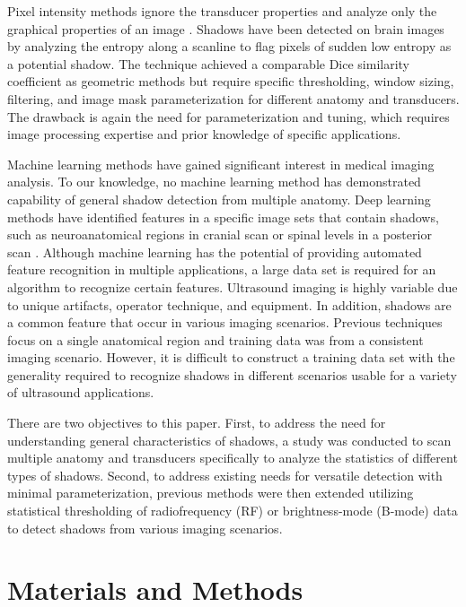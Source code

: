\documentclass[authoryear,preprint,review,12pt]{elsarticle}
\begin{document}
Pixel intensity methods ignore the transducer properties and analyze only the graphical properties of an image \citep{Hellier2010}. Shadows have been detected on brain images by analyzing the entropy along a scanline to flag pixels of sudden low entropy as a potential shadow. The technique achieved a comparable Dice similarity coefficient as geometric methods but require specific thresholding, window sizing, filtering, and image mask parameterization for different anatomy and transducers. The drawback is again the need for parameterization and tuning, which requires image processing expertise and prior knowledge of specific applications.

Machine learning methods have gained significant interest in medical imaging analysis. To our knowledge, no machine learning method has demonstrated capability of general shadow detection from multiple anatomy. Deep learning methods have identified features in a specific image sets that contain shadows, such as neuroanatomical regions in cranial scan \citep{Milletari2017} or spinal levels in a posterior scan \citep{Hetherington2017}. Although machine learning has the potential of providing automated feature recognition in multiple applications, a large data set is required for an algorithm to recognize certain features. Ultrasound imaging is highly variable due to unique artifacts, operator technique, and equipment. In addition, shadows are a common feature that occur in various imaging scenarios. Previous techniques focus on a single anatomical region and training data was from a consistent imaging scenario. However, it is difficult to construct a training data set with the generality required to recognize shadows in different scenarios usable for a variety of ultrasound applications.

There are two objectives to this paper. First, to address the need for understanding general characteristics of shadows, a study was conducted to scan multiple anatomy and transducers specifically to analyze the statistics of different types of shadows. Second, to address existing needs for versatile detection with minimal parameterization, previous methods were then extended utilizing statistical thresholding of radiofrequency (RF) or brightness-mode (B-mode) data to detect shadows from various imaging scenarios. 

\section*{Materials and Methods}
\label{MaM}
\end{document}

